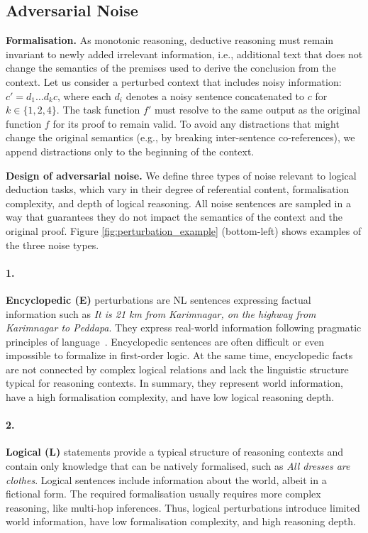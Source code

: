 \subsection{Adversarial Noise}
\textbf{Formalisation.} As monotonic reasoning, deductive reasoning must remain invariant to newly added irrelevant information, i.e., additional text that does not change the semantics of the premises used to derive the conclusion from the context.
Let us consider a perturbed context that includes noisy information: $c' = d_1 \dots d_k c$, where each $d_i$ denotes a noisy sentence concatenated to $c$ for $k \in \{1,2,4\}$. The task function $f'$ must resolve to the same output as the original function $f$ for its proof to remain valid. To avoid any distractions that might change the original semantics (e.g., by breaking inter-sentence co-references), we append distractions only to the beginning of the context. %

\noindent \textbf{Design of adversarial noise.}
We define three types of noise relevant to logical deduction tasks, which vary in their degree of referential content, formalisation complexity, and depth of logical reasoning. All noise sentences are sampled in a way that guarantees they do not impact the semantics of the context and the original proof. Figure \ref{fig:perturbation_example} (bottom-left) shows examples of the three noise types.

\paragraph{1.} \textbf{Encyclopedic (E)} perturbations are \ac{NL} sentences expressing factual information such as \textit{It is 21 km from Karimnagar, on the highway from Karimnagar to Peddapa}. They express real-world information following pragmatic principles of language~\cite{grice1975logic}.
Encyclopedic sentences are often difficult or even impossible to formalize in first-order logic. At the same time, encyclopedic facts are not connected by complex logical relations and lack the linguistic structure typical for reasoning contexts.  In summary, they represent world information, have a high formalisation complexity, and have low logical reasoning depth.
\paragraph{2.} \textbf{Logical (L)} statements provide a typical structure of reasoning contexts and contain only knowledge that can be natively formalised, such as \textit{All dresses are clothes}. Logical sentences include information about the world, albeit in a fictional form. The required formalisation usually requires more complex reasoning, like multi-hop inferences. Thus, logical perturbations introduce limited world information, have low formalisation complexity, and high reasoning depth.
